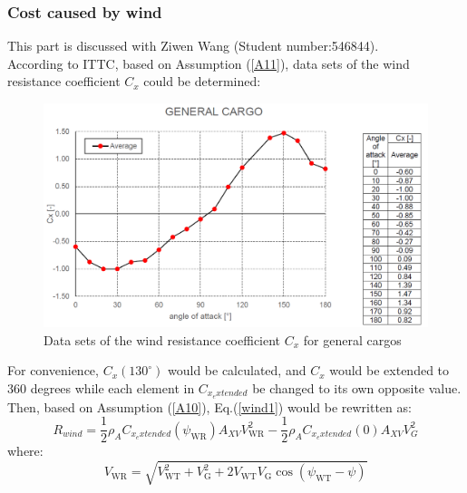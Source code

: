 \subsubsection{Cost caused by wind}
\label{Cost Wind}
This part is discussed with Ziwen Wang (Student number:546844).
\\According to ITTC\cite{2017ITTC}, based on Assumption (\ref{A11}), data sets of the wind resistance coefficient $C_{x}$ could be determined:
\begin{figure}[H]
    \centering  
	\includegraphics[width=0.9\linewidth]{wind cx.png}  
	\caption{Data sets of the wind resistance coefficient $C_{x}$ for general cargos}  
	\label{windCx}  
\end{figure}
\noindent For convenience, $C_{x}(130^{\circ})$ would be calculated, and $C_{x}$ would be extended to 360 degrees while each element in $C_{x_extended}$ be changed to its own opposite value. Then, based on Assumption (\ref{A10}), Eq.(\ref{wind1}) would be rewritten as:
\begin{equation}
    R_{wind}=\frac{1}{2} \rho_{A} C_{x_extended}\left(\psi_{\text {WR}}\right) A_{X V} V_{\text {WR}}^{2}-\frac{1}{2} \rho_{A} C_{x_extended}(0) A_{X V} V_{G}^{2}
    \label{wind2}
\end{equation}
where:
\begin{equation*}
    V_{\text {WR}}=\sqrt{V_{\text {WT}}^{2}+V_{\mathrm{G}}^{2}+2 V_{\text {WT}} V_{\mathrm{G}} \cos \left(\psi_{\text {WT}}-\psi\right)}
\end{equation*}
